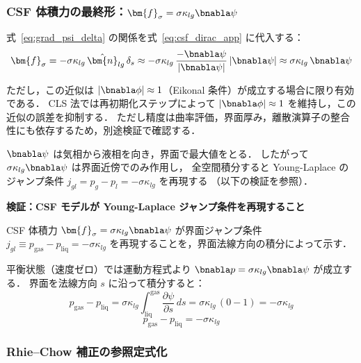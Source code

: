 \subsubsection{CSF 体積力の最終形：\texorpdfstring{$\bm{f}_\sigma = \sigma\kappa_{lg}\bnabla\psi$}{f\_sigma = sigma*kappa_lg*grad(psi)}}

式~\eqref{eq:grad_psi_delta} の関係を式~\eqref{eq:csf_dirac_app} に代入する：
\begin{equation}
  \bm{f}_\sigma = -\sigma\kappa_{lg}\,\hat{\bm{n}}_{lg}\,\delta_s
  \approx -\sigma\kappa_{lg}\,\frac{-\bnabla\psi}{|\bnabla\psi|}\,|\bnabla\psi|
  \approx \sigma\kappa_{lg}\,\bnabla\psi
  \label{eq:csf_final}
\end{equation}

ただし，この近似は $|\bnabla\phi| \approx 1$（Eikonal 条件）が成立する場合に限り有効である．
CLS 法では再初期化ステップによって $|\bnabla\phi|\approx 1$ を維持し，この近似の誤差を抑制する．
ただし精度は曲率評価，界面厚み，離散演算子の整合性にも依存するため，別途検証で確認する．

$\bnabla\psi$ は気相から液相を向き，界面で最大値をとる．
したがって $\sigma\kappa_{lg}\bnabla\psi$ は界面近傍でのみ作用し，
全空間積分すると Young-Laplace のジャンプ条件 $j_{gl}=p_g-p_l=-\sigma\kappa_{lg}$ を再現する
（以下の検証を参照）．

\medskip
\noindent\textbf{検証：CSF モデルが Young-Laplace ジャンプ条件を再現すること}
\label{sec:csf_young_laplace_app}

CSF 体積力 $\bm{f}_\sigma = \sigma\kappa_{lg}\bnabla\psi$ が界面ジャンプ条件
$j_{gl}\equiv p_{\text{gas}} - p_{\text{liq}} = -\sigma\kappa_{lg}$
を再現することを，界面法線方向の積分によって示す．

平衡状態（速度ゼロ）では運動方程式より
$\bnabla p = \sigma\kappa_{lg}\bnabla\psi$ が成立する．
界面を法線方向 $s$ に沿って積分すると：
\[
  p_{\text{gas}} - p_{\text{liq}}
  = \sigma\kappa_{lg} \int_{\text{liq}}^{\text{gas}} \frac{\partial\psi}{\partial s}\,ds
  = \sigma\kappa_{lg}\,(0 - 1) = -\sigma\kappa_{lg}
\]
\begin{equation}
  p_{\text{gas}} - p_{\text{liq}} = -\sigma\kappa_{lg}
  \label{eq:young-laplace-app}
\end{equation}

\subsubsection{Rhie--Chow 補正の参照定式化}
\label{app:rhie_chow_full}

